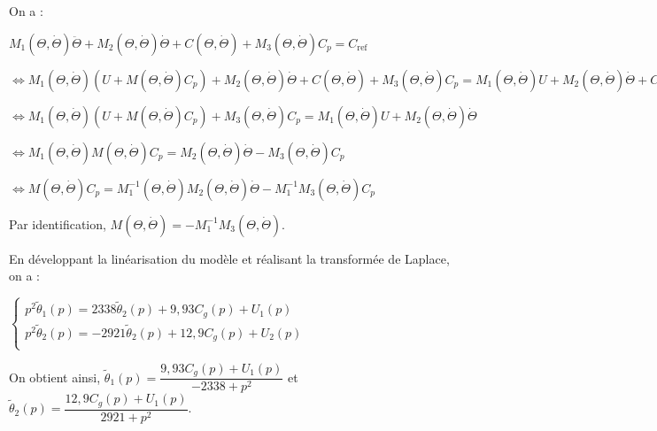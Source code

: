 \ifprof\begin{corrige}
On a  :

$
M_{1}(\Theta, \dot{\Theta}) \ddot{\Theta}+M_{2}(\Theta, \dot{\Theta}) \dot{\Theta}+C(\Theta, \dot{\Theta})+M_{3}(\Theta, \dot{\Theta}) C_{p}=C_{\mathrm{ref}}
$

$\Leftrightarrow
M_{1}(\Theta, \dot{\Theta}) \left(U+M(\Theta, \dot{\Theta}) C_{p}\right)   +M_{2}(\Theta, \dot{\Theta}) \dot{\Theta}+C(\Theta, \dot{\Theta})+M_{3}(\Theta, \dot{\Theta}) C_{p}=M_{1}(\Theta, \dot{\Theta}) U+M_{2}(\Theta, \dot{\Theta}) \dot{\Theta}+C(\Theta, \dot{\Theta})
$


$\Leftrightarrow
M_{1}(\Theta, \dot{\Theta}) \left(U+M(\Theta, \dot{\Theta}) C_{p}\right)   +M_{3}(\Theta, \dot{\Theta}) C_{p}=M_{1}(\Theta, \dot{\Theta}) U+M_{2}(\Theta, \dot{\Theta}) \dot{\Theta}
$

$\Leftrightarrow
M_{1}(\Theta, \dot{\Theta}) M(\Theta, \dot{\Theta}) C_{p}   =
M_{2}(\Theta, \dot{\Theta}) \dot{\Theta} - M_{3}(\Theta, \dot{\Theta}) C_{p}
$


$\Leftrightarrow
 M(\Theta, \dot{\Theta}) C_{p}   =
M_{1}^{-1}(\Theta, \dot{\Theta}) M_{2}(\Theta, \dot{\Theta}) \dot{\Theta} - M_{1}^{-1}M_{3}(\Theta, \dot{\Theta}) C_{p}
$

Par identification, $M(\Theta, \dot{\Theta}) = - M_{1}^{-1}M_{3}(\Theta, \dot{\Theta}) $.
\end{corrige}\else\fi



\ifprof\begin{corrige}
En développant la linéarisation du modèle et réalisant la transformée de Laplace, on a :

$
\left\{
\begin{array}{l}
p^2 \tilde{\theta}_1(p) = 2338 \tilde{\theta}_2(p) + 9,93 C_g(p) + U_1(p) \\
p^2 \tilde{\theta}_2(p) = -2921 \tilde{\theta}_2(p) + 12,9 C_g(p) + U_2(p) \\
\end{array}
\right.
$

On obtient ainsi,
$\tilde{\theta}_1(p)=\dfrac{ 9,93 C_g(p) + U_1(p)}{-2338+p^2}$ et
$\tilde{\theta}_2(p)=\dfrac{ 12,9 C_g(p) + U_1(p)}{2921+p^2}$.


\end{corrige}\else\fi

